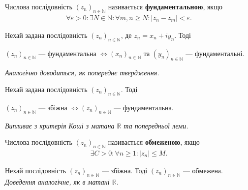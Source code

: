 \documentclass{math_library}
\begin{document}
\begin{definition}
Числова послідовність $(z_n)_{n \in \mathbb{N}}$ називається \textbf{фундаментальною}, якщо
\begin{align*}
\forall \varepsilon > 0: \exists N \in \mathbb{N}: \forall m,n \geq N: |z_n-z_m| < \varepsilon.
\end{align*}
\end{definition}

\begin{lemma}
Нехай задана послідовність $(z_n)_{n \in \mathbb{N}}$, де $z_n = x_n + i y_n$. Тоді
\begin{center}
$(z_n)_{n \in \mathbb{N}}$ --- фундаментальна $\iff (x_n)_{n \in \mathbb{N}}$ та $(y_n)_{n \in \mathbb{N}}$ --- фундаментальні.
\end{center}
\textit{Аналогічно доводиться, як попереднє твердження.}
\end{lemma}

\begin{theorem}
Нехай задана послідовність $(z_n)_{n \in \mathbb{N}}$. Тоді
\begin{center}
$(z_n)_{n \in \mathbb{N}}$ --- збіжна $\iff (z_n)_{n \in \mathbb{N}}$ --- фундаментальна.
\end{center}
\textit{Випливає з критерія Коші з матана $\mathbb{R}$ та попередньої леми.}
\end{theorem}

\begin{definition}
Числова послідовність $(z_n)_{n \in \mathbb{N}}$ називається \textbf{обмеженою}, якщо
\begin{align*}
\exists C > 0: \forall n \geq 1: |z_n| \leq M.
\end{align*}
\end{definition}

\begin{proposition}
Нехай послідовність $(z_n)_{n \in \mathbb{N}}$ --- збіжна. Тоді $(z_n)_{n \in \mathbb{N}}$ --- обмежена.\\
\textit{Доведення аналогічне, як в матані $\mathbb{R}$.}
\end{proposition}
\end{document}
